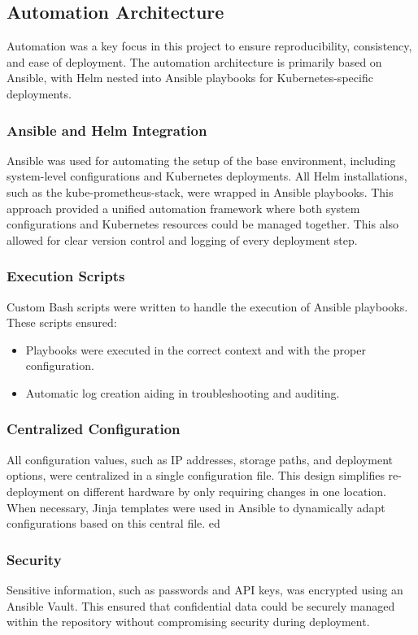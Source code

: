 \subsection{Automation Architecture}

Automation was a key focus in this project to ensure reproducibility, consistency, and ease of deployment. The automation architecture is primarily based on Ansible, with Helm nested into Ansible playbooks for Kubernetes-specific deployments.

\subsubsection{Ansible and Helm Integration}
Ansible was used for automating the setup of the base environment, including system-level configurations and Kubernetes deployments. All Helm installations, such as the kube-prometheus-stack, were wrapped in Ansible playbooks. This approach provided a unified automation framework where both system configurations and Kubernetes resources could be managed together. This also allowed for clear version control and logging of every deployment step.

\subsubsection{Execution Scripts}
Custom Bash scripts were written to handle the execution of Ansible playbooks. These scripts ensured:
\begin{itemize}
    \item Playbooks were executed in the correct context and with the proper configuration.
    \item Automatic log creation aiding in troubleshooting and auditing.
\end{itemize}

\subsubsection{Centralized Configuration}
All configuration values, such as IP addresses, storage paths, and deployment options, were centralized in a single configuration file. This design simplifies re-deployment on different hardware by only requiring changes in one location. When necessary, Jinja templates were used in Ansible to dynamically adapt configurations based on this central file.
ed
\subsubsection{Security}
Sensitive information, such as passwords and API keys, was encrypted using an Ansible Vault. This ensured that confidential data could be securely managed within the repository without compromising security during deployment.



